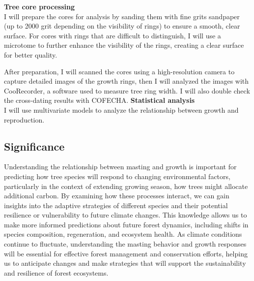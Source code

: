\documentclass[11pt,letter]{article}
\begin{document}
\textbf{Tree core processing}\\
I will prepare the cores for analysis by sanding them with fine grits sandpaper (up to 2000 grit depending on the visibility of rings) to ensure a smooth, clear surface. For cores with rings that are difficult to distinguish, I will use a microtome to further enhance the visibility of the rings, creating a clear surface for better quality.\par
After preparation, I will scanned the cores using a high-resolution camera to capture detailed images of the growth rings, then I will analyzed the images with CooRecorder, a software used to measure tree ring width. I will also double check the cross-dating results with COFECHA.
\textbf{Statistical analysis}\\
I will use multivariate models to analyze the relationship between growth and reproduction.

\subsection{Significance}
Understanding the relationship between masting and growth is important for predicting how tree species will respond to changing environmental factors, particularly in the context of extending growing season, how trees might allocate additional carbon. By examining how these processes interact, we can gain insights into the adaptive strategies of different species and their potential resilience or vulnerability to future climate changes. This knowledge allows us to make more informed predictions about future forest dynamics, including shifts in species composition, regeneration, and ecosystem health. As climate conditions continue to fluctuate, understanding the  masting behavior and growth responses will be essential for effective forest management and conservation efforts, helping us to anticipate changes and make strategies that will support the sustainability and resilience of forest ecosystems.\par
\end{document}
